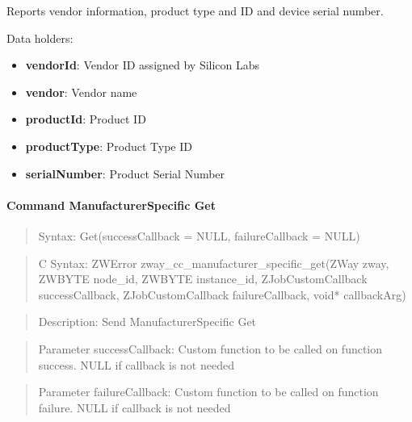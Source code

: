 Reports vendor information, product type and ID and device serial number.
\newline

\noindent
Data holders:

\begin{itemize}
\item \textbf{vendorId}: Vendor ID assigned by Silicon Labs
\item \textbf{vendor}: Vendor name
\item \textbf{productId}: Product ID
\item \textbf{productType}: Product Type ID
\item \textbf{serialNumber}: Product Serial Number
\end{itemize}

\paragraph{Command ManufacturerSpecific Get}
\begin{quote}Syntax: Get(successCallback = NULL, failureCallback = NULL)\end{quote}
\begin{quote}C Syntax: ZWError zway\_cc\_manufacturer\_specific\_get(ZWay zway, ZWBYTE node\_id, ZWBYTE instance\_id, ZJobCustomCallback successCallback, ZJobCustomCallback failureCallback, void* callbackArg)\end{quote}
\begin{quote}Description: Send ManufacturerSpecific Get\end{quote}
\begin{quote}Parameter successCallback: Custom function to be called on function success. NULL if callback is not needed\end{quote}
\begin{quote}Parameter failureCallback: Custom function to be called on function failure. NULL if callback is not needed\end{quote}



